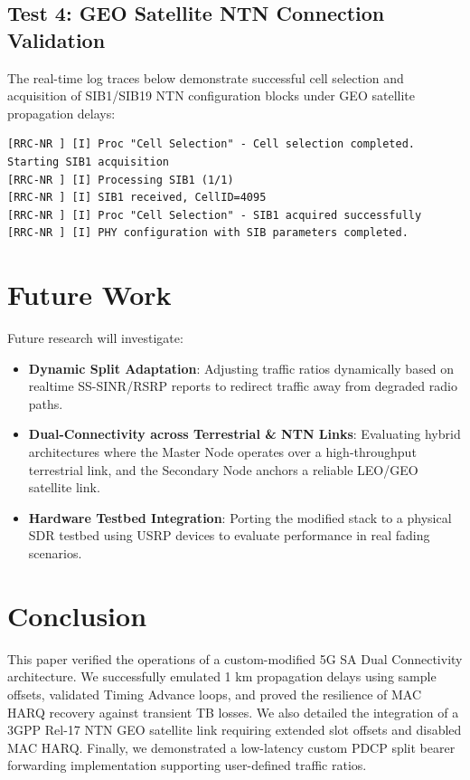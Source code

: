 \documentclass[conference]{IEEEtran}
\begin{document}
\subsection{Test 4: GEO Satellite NTN Connection Validation}
The real-time log traces below demonstrate successful cell selection and acquisition of SIB1/SIB19 NTN configuration blocks under GEO satellite propagation delays:
\begin{lstlisting}
[RRC-NR ] [I] Proc "Cell Selection" - Cell selection completed. Starting SIB1 acquisition
[RRC-NR ] [I] Processing SIB1 (1/1)
[RRC-NR ] [I] SIB1 received, CellID=4095
[RRC-NR ] [I] Proc "Cell Selection" - SIB1 acquired successfully
[RRC-NR ] [I] PHY configuration with SIB parameters completed.
\end{lstlisting}

\section{Future Work}
Future research will investigate:
\begin{itemize}
    \item \textbf{Dynamic Split Adaptation}: Adjusting traffic ratios dynamically based on realtime SS-SINR/RSRP reports to redirect traffic away from degraded radio paths.
    \item \textbf{Dual-Connectivity across Terrestrial \& NTN Links}: Evaluating hybrid architectures where the Master Node operates over a high-throughput terrestrial link, and the Secondary Node anchors a reliable LEO/GEO satellite link.
    \item \textbf{Hardware Testbed Integration}: Porting the modified stack to a physical SDR testbed using USRP devices to evaluate performance in real fading scenarios.
\end{itemize}

\section{Conclusion}
This paper verified the operations of a custom-modified 5G SA Dual Connectivity architecture. We successfully emulated 1 km propagation delays using sample offsets, validated Timing Advance loops, and proved the resilience of MAC HARQ recovery against transient TB losses. We also detailed the integration of a 3GPP Rel-17 NTN GEO satellite link requiring extended slot offsets and disabled MAC HARQ. Finally, we demonstrated a low-latency custom PDCP split bearer forwarding implementation supporting user-defined traffic ratios.
\end{document}
